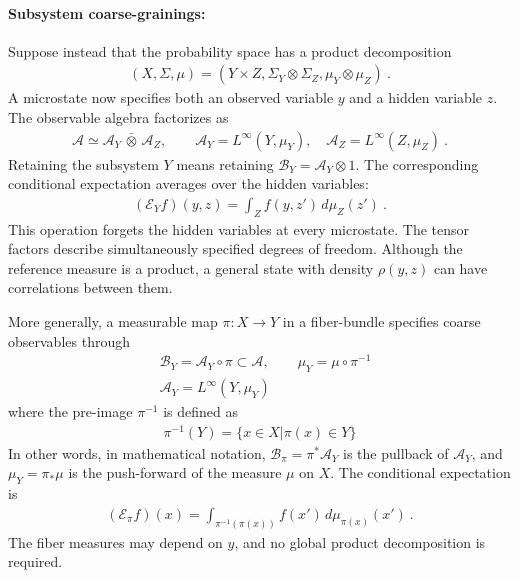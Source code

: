 \documentclass[a4paper,11pt]{article}
\theoremstyle{definition}
\newcommand{\mA}{\mathcal{A}}
\newcommand{\mB}{\mathcal{B}}
\newcommand{\nn}{\nonumber}
\begin{document}
\paragraph{Subsystem coarse-grainings:}
Suppose instead that the probability space has a product decomposition
\begin{align}
    (X,\Sigma,\mu)=(Y\times Z,\Sigma_Y\otimes\Sigma_Z,\mu_Y\otimes\mu_Z)\ .
\end{align}
A microstate now specifies both an observed variable $y$ and a hidden variable $z$. The observable algebra factorizes as
\begin{align}
    \mA\simeq\mA_Y\,\bar\otimes\,\mA_Z,
    \qquad \mA_Y=L^\infty(Y,\mu_Y),\quad
    \mA_Z=L^\infty(Z,\mu_Z)\ .
\end{align}
Retaining the subsystem $Y$ means retaining $\mB_Y=\mA_Y\otimes 1$. The corresponding conditional expectation averages over the hidden variables:
\begin{align}
    (\mathcal{E}_Y f)(y,z)=\int_Z f(y,z')\,d\mu_Z(z')\ .
\end{align}
This operation forgets the hidden variables at every microstate. The tensor factors describe simultaneously specified degrees of freedom. Although the reference measure is a product, a general state with density $\rho(y,z)$ can have correlations between them. 

More generally, a measurable map $\pi:X\to Y$ in a fiber-bundle specifies coarse observables through
\begin{align}
    &\mB_Y=\mA_Y\circ \pi\subset \mA,
    \qquad \mu_Y=\mu\circ \pi^{-1}\nn\\
    &\mA_Y=L^\infty(Y,\mu_Y)
\end{align}
where the pre-image $\pi^{-1}$ is defined as
\begin{align}
\pi^{-1}(Y)=\{x\in X|\pi(x)\in Y\}
\end{align}
In other words, in mathematical notation, $\mB_\pi=\pi^*\mA_Y$ is the pullback of $\mA_Y$, and $\mu_Y=\pi_*\mu$ is the push-forward of the measure $\mu$ on $X$.
The conditional expectation is
\begin{align}
    (\mathcal{E}_\pi f)(x)=\int_{\pi^{-1}(\pi(x))}f(x')\,d\mu_{\pi(x)}(x')\ .
\end{align}
The fiber measures may depend on $y$, and no global product decomposition is required. 
\end{document}
